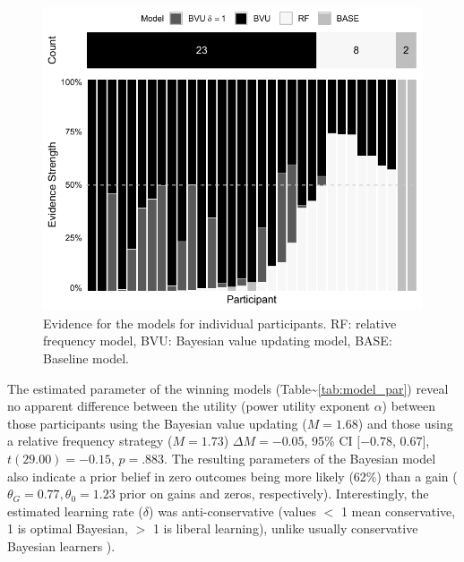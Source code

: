 \documentclass[a4paper, man, floatsintext]{apa6}
\begin{document}
\begin{figure}

{\centering \includegraphics{../figuresmodel_weights-1} 

}

\caption{Evidence for the models for individual participants. RF: relative frequency model, BVU: Bayesian value updating model, BASE: Baseline model.}\label{fig:model_weights}
\end{figure}

The estimated parameter of the winning models
(Table\textasciitilde{}\ref{tab:model_par}) reveal no apparent
difference between the utility (power utility exponent \(\alpha\))
between those participants using the Bayesian value updating
(\(M=1.68\)) and those using a relative frequency strategy (\(M=1.73\))
\(\Delta M = -0.05\), 95\% CI \([-0.78\), \(0.67]\),
\(t(29.00) = -0.15\), \(p = .883\). The resulting parameters of the
Bayesian model also indicate a prior belief in zero outcomes being more
likely (62\%) than a gain (\(\theta_G = 0.77, \theta_0 = 1.23\) prior on
gains and zeros, respectively). Interestingly, the estimated learning
rate (\(\delta\)) was anti-conservative (values \(<\) 1 mean
conservative, 1 is optimal Bayesian, \(>\) 1 is liberal learning),
unlike usually conservative Bayesian learners
\citep{Edwards1967,Tauber2017}).
\end{document}
